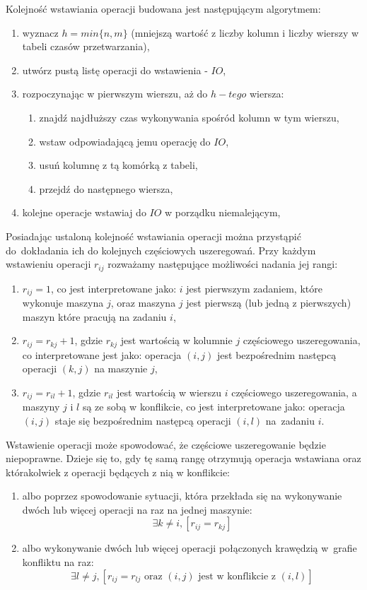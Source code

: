 \documentclass[brudnopis]{xmgr}
\begin{document}
Kolejność wstawiania operacji budowana jest następującym algorytmem:
\begin{enumerate}
    \item wyznacz $h = min\{n, m\}$ (mniejszą wartość z liczby kolumn i liczby wierszy w tabeli czasów przetwarzania),
    \item utwórz pustą listę operacji do wstawienia - $IO$,
    \item rozpoczynając w pierwszym wierszu, aż do $h-tego$ wiersza:
    \begin{enumerate}
        \item znajdź najdłuższy czas wykonywania spośród kolumn w tym wierszu,
        \item wstaw odpowiadającą jemu operację do $IO$,
        \item usuń kolumnę z tą komórką z tabeli,
        \item przejdź do następnego wiersza,
    \end{enumerate}
    \item kolejne operacje wstawiaj do $IO$ w porządku niemalejącym,
\end{enumerate}

Posiadając ustaloną kolejność wstawiania operacji można przystąpić do~dokładania ich do kolejnych częściowych uszeregowań. Przy każdym wstawieniu operacji $r_{ij}$ rozważamy następujące możliwości nadania jej rangi:
\begin{enumerate}
    \item $r_{ij} = 1$, co jest interpretowane jako: $i$ jest pierwszym zadaniem, które wykonuje maszyna $j$, oraz maszyna $j$ jest pierwszą (lub jedną z pierwszych) maszyn które pracują na zadaniu $i$,
    \item $r_{ij} = r_{kj} + 1$, gdzie $r_{kj}$ jest wartością w kolumnie $j$ częściowego uszeregowania, co interpretowane jest jako: operacja $(i, j)$ jest bezpośrednim następcą operacji $(k, j)$ na maszynie $j$,
    \item $r_{ij} = r_{il} + 1$, gdzie $r_{il}$ jest wartością w wierszu $i$ częściowego uszeregowania, a maszyny $j$ i $l$ są ze sobą w konflikcie, co jest interpretowane jako: operacja $(i, j)$ staje się bezpośrednim następcą operacji $(i, l)$ na~zadaniu $i$.
\end{enumerate}

Wstawienie operacji może spowodować, że częściowe uszeregowanie będzie niepoprawne. Dzieje się to, gdy tę samą rangę otrzymują operacja wstawiana oraz którakolwiek z operacji będących z nią w konflikcie:
\begin{enumerate}
    \item albo poprzez spowodowanie sytuacji, która przekłada się na wykonywanie dwóch lub więcej operacji na raz na jednej maszynie:
    $$\exists k \neq i, [r_{ij}=r_{kj}]$$
    \item albo wykonywanie dwóch lub więcej operacji połączonych krawędzią w~grafie konfliktu na raz:
    $$\exists l \neq j, [r_{ij}=r_{lj} \textrm{ oraz } (i,j) \textrm{ jest w konflikcie z } (i,l)]$$
\end{enumerate}
 
\end{document}

